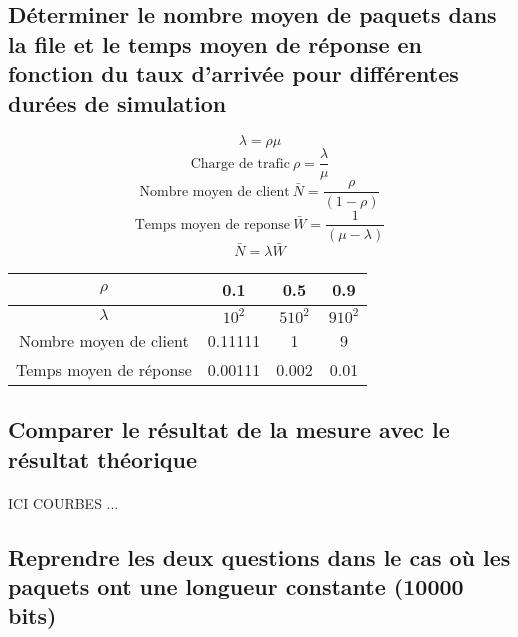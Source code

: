         \subsection{Déterminer le nombre moyen de paquets dans la file et le temps moyen de réponse en fonction du taux d'arrivée pour différentes durées de simulation}
\[  \lambda = \rho \mu \]
\[  \text{Charge de trafic} \ \rho = \frac{\lambda}{\mu} \]
\[  \text{Nombre moyen de client} \ \bar{N} = \frac{\rho}{(1 - \rho)} \]
\[  \text{Temps moyen de reponse} \ \bar{W} = \frac{1}{(\mu - \lambda)} \]
\[  \bar{N} = \lambda \bar{W} \]
\begin{center}
    \begin{tabular}{ | c | c| c | c | }
        \hline
            $\rho$ & 0.1 & 0.5 & 0.9 \\
        \hline
            $\lambda$ & $10^{2}$ & $5 10^{2}$ & $9 10^{2}$ \\
        \hline
            Nombre moyen de client & 0.11111 & 1 & 9 \\
        \hline
            Temps moyen de réponse & 0.00111 & 0.002 & 0.01 \\
        \hline
    \end{tabular}
\end{center}
%
        \subsection{Comparer le résultat de la mesure avec le résultat théorique}
            \paragraph{}
ICI COURBES ...
%
        \subsection{Reprendre les deux questions dans le cas où les paquets ont une longueur constante (10000 bits)}
%
